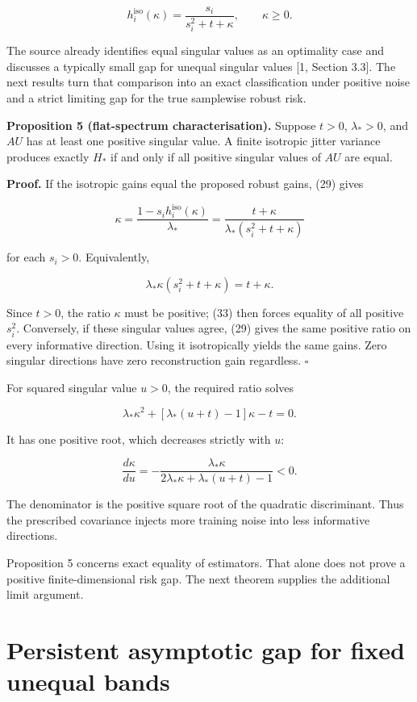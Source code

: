 \documentclass[11pt,a4paper]{article}
\begin{document}
\[
h_i^{\mathrm{iso}}(\kappa)=\frac{s_i}{s_i^2+t+\kappa},
\qquad\kappa\ge0.
\tag{32}
\]

The source already identifies equal singular values as an optimality
case and discusses a typically small gap for unequal singular values
{[}1, Section 3.3{]}. The next results turn that comparison into an
exact classification under positive noise and a strict limiting gap for
the true samplewise robust risk.

\textbf{Proposition 5 (flat-spectrum characterisation).} Suppose
\(t>0\), \(\lambda_*>0\), and \(AU\) has at least one positive singular
value. A finite isotropic jitter variance produces exactly \(H_*\) if
and only if all positive singular values of \(AU\) are equal.

\textbf{Proof.} If the isotropic gains equal the proposed robust gains,
(29) gives

\[
\kappa=
\frac{1-s_i h_i^{\mathrm{iso}}(\kappa)}{\lambda_*}
=\frac{t+\kappa}{\lambda_*(s_i^2+t+\kappa)}
\]

for each \(s_i>0\). Equivalently,

\[
\lambda_*\kappa(s_i^2+t+\kappa)=t+\kappa.
\tag{33}
\]

Since \(t>0\), the ratio \(\kappa\) must be positive; (33) then forces
equality of all positive \(s_i^2\). Conversely, if these singular values
agree, (29) gives the same positive ratio on every informative
direction. Using it isotropically yields the same gains. Zero singular
directions have zero reconstruction gain regardless. \(\square\)

For squared singular value \(u>0\), the required ratio solves

\[
\lambda_*\kappa^2+[\lambda_*(u+t)-1]\kappa-t=0.
\tag{34}
\]

It has one positive root, which decreases strictly with \(u\):

\[
\frac{d\kappa}{du}
=-\frac{\lambda_*\kappa}
{2\lambda_*\kappa+\lambda_*(u+t)-1}<0.
\]

The denominator is the positive square root of the quadratic
discriminant. Thus the prescribed covariance injects more training noise
into less informative directions.

Proposition 5 concerns exact equality of estimators. That alone does not
prove a positive finite-dimensional risk gap. The next theorem supplies
the additional limit argument.

\hypertarget{persistent-asymptotic-gap-for-fixed-unequal-bands}{%
\section{Persistent asymptotic gap for fixed unequal
bands}\label{persistent-asymptotic-gap-for-fixed-unequal-bands}}
\end{document}
